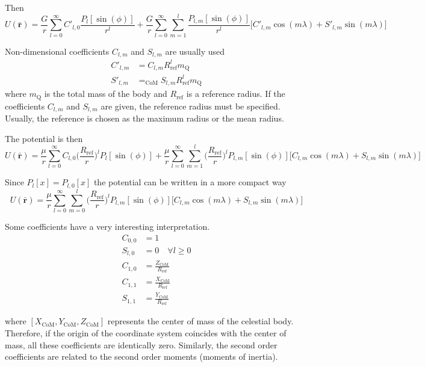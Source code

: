 \documentclass[]{AVSSimReportMemo}
\begin{document}
Then
\begin{equation}
U(\mathbf{\bar r}) = \frac{G}{r} \sum_{l=0}^\infty C'_{l,0} \frac{P_l[\sin(\phi)]}{r^l} + \frac{G}{r} \sum_{l=0}^\infty \sum_{m=1}^l \frac{P_{l,m}[\sin(\phi)]}{r^l} \big[C'_{l,m} \cos(m \lambda) + S'_{l,m} \sin(m \lambda)]
\end{equation}

Non-dimensional coefficients $C_{l,m}$ and $S_{l,m}$ are usually used
\begin{align}
C'_{l,m} &= C_{l,m} R_{\text{ref}}^l m_\text{Q}\\
S'_{l,m} &= _\text{CoM}S_{l,m} R_{\text{ref}}^l m_\text{Q}
\end{align}
where $m_\text{Q}$ is the total mass of the body and $R_{\text{ref}}$ is a reference radius. If the coefficients $C_{l,m}$ and $S_{l,m}$ are given, the reference radius must be specified. Usually, the reference is chosen as the maximum radius or the mean radius\cite{scheeres2012}.

The potential is then
\begin{equation}
U(\mathbf{\bar r}) = \frac{\mu}{r} \sum_{l=0}^\infty C_{l,0} \bigg(\frac{R_{\text{ref}}}{r}\bigg)^l P_l[\sin(\phi)] + \frac{\mu}{r} \sum_{l=0}^\infty \sum_{m=1}^l \bigg(\frac{R_{\text{ref}}}{r}\bigg)^l P_{l,m}[\sin(\phi)] \big[C_{l,m} \cos(m \lambda) + S_{l,m} \sin(m \lambda)\big]
\end{equation}

Since $P_l[x] = P_{l,0}[x]$ the potential can be written in a more compact way
\begin{equation}
U(\mathbf{\bar r}) = \frac{\mu}{r} \sum_{l=0}^\infty \sum_{m=0}^l \bigg(\frac{R_{\text{ref}}}{r}\bigg)^l P_{l,m}[\sin(\phi)] \big[C_{l,m} \cos(m \lambda) + S_{l,m} \sin(m \lambda)\big]
\end{equation}

Some coefficients have a very interesting interpretation. 
\begin{align}
C_{0,0} &= 1\\
S_{l,0} &= 0 \quad \forall l \geq 0\\
C_{1,0} &= \frac{Z_{\text{CoM}}}{R_{\text{ref}}}\\
C_{1,1} &= \frac{X_{\text{CoM}}}{R_{\text{ref}}}\\
S_{1,1} &= \frac{Y_{\text{CoM}}}{R_{\text{ref}}}
\end{align}

where $[X_\text{CoM}, Y_\text{CoM}, Z_\text{CoM}]$ represents the center of mass of the celestial body. Therefore, if the origin of the coordinate system coincides with the center of mass, all these coefficients are identically zero. Similarly, the second order coefficients are related to the second order moments (moments of inertia).
\end{document}
